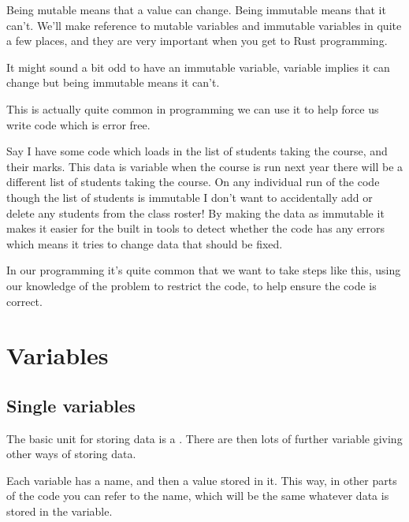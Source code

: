 \documentclass[letterpaper,10pt,british]{sphinxmanual}
\begin{document}
\sphinxAtStartPar
Being mutable means that a value can change. Being immutable means that it can’t. We’ll make reference to mutable variables and immutable variables in quite a few places, and they are very important when you get to Rust programming.

\sphinxAtStartPar
It might sound a bit odd to have an immutable variable, variable implies it can change but being immutable means it can’t.

\sphinxAtStartPar
This is actually quite common in programming \sphinxhyphen{} we can use it to help force us write code which is error free.

\sphinxAtStartPar
Say I have some code which loads in the list of students taking the course, and their marks. This data is variable \sphinxhyphen{} when the course is run next year there will be a different list of students taking the course. On any individual run of the code though the list of students is immutable \sphinxhyphen{} I don’t want to accidentally add or delete any students from the class roster! By making the data as immutable it makes it easier for the built in tools to detect whether the code has any errors which means it tries to change data that should be fixed.

\sphinxAtStartPar
In our programming it’s quite common that we want to take steps like this, using our knowledge of the problem to restrict the code, to help ensure the code is correct.

\sphinxstepscope


\section{Variables}
\label{\detokenize{chapters/programming_fundamentals/variables:variables}}\label{\detokenize{chapters/programming_fundamentals/variables:id1}}\label{\detokenize{chapters/programming_fundamentals/variables::doc}}

\subsection{Single variables}
\label{\detokenize{chapters/programming_fundamentals/variables:single-variables}}\label{\detokenize{chapters/programming_fundamentals/variables:id2}}
\sphinxAtStartPar
The basic unit for storing data is a . There are then lots of further variable  giving other ways of storing data.

\sphinxAtStartPar
Each variable has a name, and then a value stored in it. This way, in other parts of the code you can refer to the name, which will be the same whatever data is stored in the variable.
\end{document}
